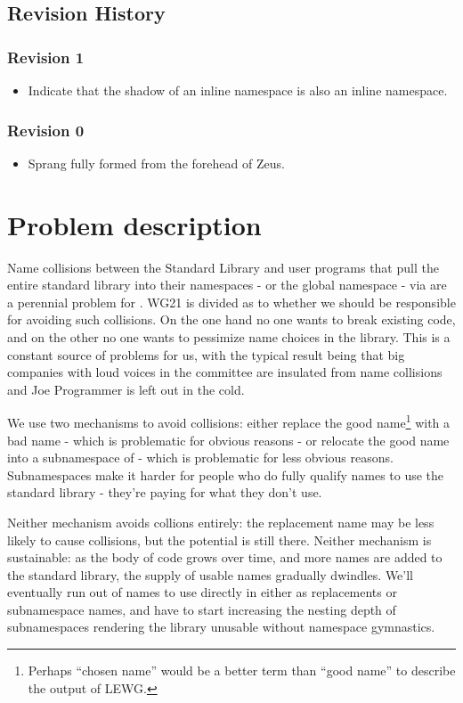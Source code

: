 \section{Revision History}
\subsection{Revision 1}
\begin{itemize}
\item Indicate that the shadow of an inline namespace is also an inline
  namespace.
\end{itemize}
\subsection{Revision 0}
\begin{itemize}
\item Sprang fully formed from the forehead of Zeus.
\end{itemize}

\chapter{Problem description}

Name collisions between the Standard Library and user programs that pull the
entire standard library into their namespaces - or the global namespace - via
 are a perennial problem for \Cpp. WG21 is divided
as to whether we should be responsible for avoiding such collisions. On the one
hand no one wants to break existing code, and on the other no one wants to
pessimize name choices in the library. This is a constant source of problems for
us, with the typical result being that big companies with loud voices in the
committee are insulated from name collisions and Joe Programmer is left out in
the cold.

We use two mechanisms to avoid collisions: either replace the good
name\footnote{Perhaps ``chosen name'' would be a better term than ``good name''
to describe the output of LEWG.} with a bad name - which is problematic for
obvious reasons - or relocate the good name into a subnamespace of  -
which is problematic for less obvious reasons. Subnamespaces make it harder for
people who do fully qualify names to use the standard library - they're paying
for what they don't use.

Neither mechanism avoids collions entirely: the replacement name may be less
likely to cause collisions, but the potential is still there. Neither mechanism
is sustainable: as the body of \Cpp{} code grows over time, and more names are
added to the standard library, the supply of usable names gradually dwindles.
We'll eventually run out of names to use directly in  either as
replacements or subnamespace names, and have to start increasing the nesting
depth of subnamespaces rendering the library unusable without namespace
gymnastics.

